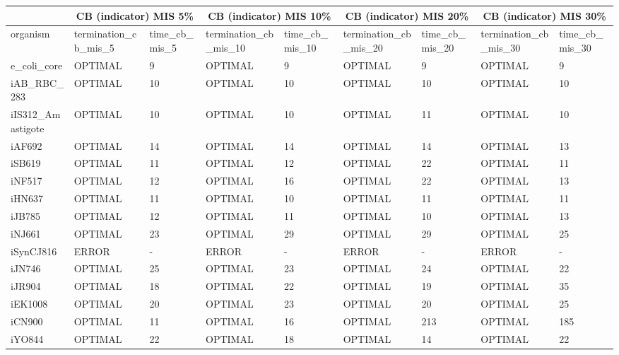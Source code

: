 \begin{table}[!ht]
    \small
    \centering
    \begin{tabular}{|l|l|l|l|l|l|l|l|l|}
    \hline
        \multicolumn{1}{|c}{} & \multicolumn{2}{|c|}{CB (indicator) MIS 5\%} & \multicolumn{2}{|c|}{CB (indicator) MIS 10\%} & \multicolumn{2}{|c|}{CB (indicator) MIS 20\%} & \multicolumn{2}{|c|}{CB (indicator) MIS 30\%} \\ \hline
        organism & termination\_cb\_mis\_5 & time\_cb\_mis\_5 & termination\_cb\_mis\_10 & time\_cb\_mis\_10 & termination\_cb\_mis\_20 & time\_cb\_mis\_20 & termination\_cb\_mis\_30 & time\_cb\_mis\_30 \\ \hline
        e\_coli\_core & OPTIMAL & 9 & OPTIMAL & 9 & OPTIMAL & 9 & OPTIMAL & 9 \\ \hline
        iAB\_RBC\_283 & OPTIMAL & 10 & OPTIMAL & 10 & OPTIMAL & 10 & OPTIMAL & 10 \\ \hline
        iIS312\_Amastigote & OPTIMAL & 10 & OPTIMAL & 10 & OPTIMAL & 11 & OPTIMAL & 10 \\ \hline
        iAF692 & OPTIMAL & 14 & OPTIMAL & 14 & OPTIMAL & 14 & OPTIMAL & 13 \\ \hline
        iSB619 & OPTIMAL & 11 & OPTIMAL & 12 & OPTIMAL & 22 & OPTIMAL & 11 \\ \hline
        iNF517 & OPTIMAL & 12 & OPTIMAL & 16 & OPTIMAL & 22 & OPTIMAL & 13 \\ \hline
        iHN637 & OPTIMAL & 11 & OPTIMAL & 10 & OPTIMAL & 11 & OPTIMAL & 11 \\ \hline
        iJB785 & OPTIMAL & 12 & OPTIMAL & 11 & OPTIMAL & 10 & OPTIMAL & 13 \\ \hline
        iNJ661 & OPTIMAL & 23 & OPTIMAL & 29 & OPTIMAL & 29 & OPTIMAL & 25 \\ \hline
        iSynCJ816 & ERROR & - & ERROR & - & ERROR & - & ERROR & - \\ \hline
        iJN746 & OPTIMAL & 25 & OPTIMAL & 23 & OPTIMAL & 24 & OPTIMAL & 22 \\ \hline
        iJR904 & OPTIMAL & 18 & OPTIMAL & 22 & OPTIMAL & 19 & OPTIMAL & 35 \\ \hline
        iEK1008 & OPTIMAL & 20 & OPTIMAL & 23 & OPTIMAL & 20 & OPTIMAL & 25 \\ \hline
        iCN900 & OPTIMAL & 11 & OPTIMAL & 16 & OPTIMAL & 213 & OPTIMAL & 185 \\ \hline
        iYO844 & OPTIMAL & 22 & OPTIMAL & 18 & OPTIMAL & 14 & OPTIMAL & 22 \\ \hline

\end{tabular}
\end{table}
